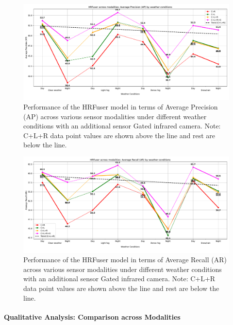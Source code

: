 \documentclass[report.tex]{subfiles}
\begin{document}
    \begin{figure}[]
        \centering
        \includegraphics[width=1.0\textwidth]{images/results/hrfuser/additional_modality/ap_2.pdf}
        \caption{Performance of the HRFuser model in terms of Average Precision (AP) across various sensor modalities under different weather conditions with an additional sensor Gated infrared camera. Note: C+L+R data point values are shown above the line and rest are below the line.}
        \label{fig:hrfuser_ap_2}
    \end{figure}

    \begin{figure}[]
        \centering
        \includegraphics[width=1.0\textwidth]{images/results/hrfuser/additional_modality/ar_2.pdf}
        \caption{Performance of the HRFuser model in terms of Average Recall (AR) across various sensor modalities under different weather conditions with an additional sensor Gated infrared camera. Note: C+L+R data point values are shown above the line and rest are below the line.}
        \label{fig:hrfuser_ar_2}
    \end{figure}

    \paragraph*{Qualitative Analysis: Comparison across Modalities}
\end{document}
